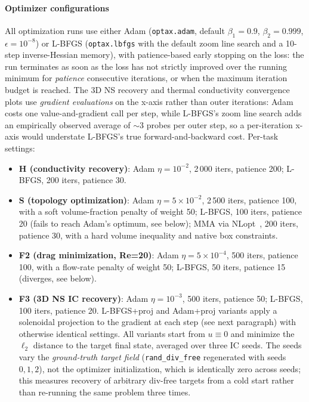 \documentclass[11pt,a4paper]{article}
\begin{document}
\paragraph{Optimizer configurations}
All optimization runs use either Adam (\texttt{optax.adam}, default
$\beta_1{=}0.9$, $\beta_2{=}0.999$, $\epsilon{=}10^{-8}$) or L-BFGS
(\texttt{optax.lbfgs} with the default zoom line search and a 10-step
inverse-Hessian memory), with patience-based early stopping on the loss:
the run terminates as soon as the loss has not strictly improved over
the running minimum for \emph{patience} consecutive iterations, or when
the maximum iteration budget is reached.
The 3D NS recovery and thermal conductivity convergence plots use
\emph{gradient evaluations} on the x-axis rather than outer iterations:
Adam costs one value-and-gradient call per step, while L-BFGS's zoom line
search adds an empirically observed average of $\sim$3 probes per outer
step, so a per-iteration x-axis would understate L-BFGS's true
forward-and-backward cost.
Per-task settings:
\begin{itemize}\itemsep0pt
  \item \textbf{H (conductivity recovery)}: Adam $\eta{=}10^{-2}$,
        2\,000 iters, patience 200; L-BFGS, 200 iters, patience 30.
  \item \textbf{S (topology optimization)}: Adam $\eta{=}5{\times}10^{-2}$,
        2\,500 iters, patience 100, with a soft volume-fraction penalty
        of weight 50; L-BFGS, 100 iters, patience 20 (fails to reach Adam's optimum, see below);
        MMA via NLopt~\citep{svanberg1987mma}, 200 iters, patience 30,
        with a hard volume inequality and native box constraints.
  \item \textbf{F2 (drag minimization, Re=20)}: Adam $\eta{=}5{\times}10^{-4}$,
        500 iters, patience 100, with a flow-rate penalty of weight 50;
        L-BFGS, 50 iters, patience 15 (diverges, see below).
  \item \textbf{F3 (3D NS IC recovery)}: Adam $\eta{=}10^{-3}$, 500 iters,
        patience 50; L-BFGS, 100 iters, patience 20.
        L-BFGS+proj and Adam+proj variants apply a solenoidal projection to
        the gradient at each step (see next paragraph) with otherwise
        identical settings. All variants start from $u\equiv 0$ and minimize
        the $\ell_2$ distance to the target final state, averaged over three
        IC seeds. The seeds vary the \emph{ground-truth target field}
        (\texttt{rand\_div\_free} regenerated with seeds $0,1,2$), not the
        optimizer initialization, which is identically zero across seeds;
        this measures recovery of arbitrary div-free targets from a cold
        start rather than re-running the same problem three times.
\end{itemize}
\end{document}
